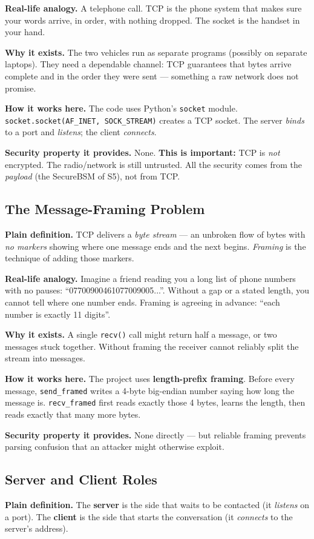 \documentclass[11pt,a4paper]{article}
\begin{document}
\textbf{Real-life analogy.} A telephone call. TCP is the phone system that makes
sure your words arrive, in order, with nothing dropped. The socket is the handset
in your hand.

\textbf{Why it exists.} The two vehicles run as separate programs (possibly on
separate laptops). They need a dependable channel: TCP guarantees that bytes
arrive complete and in the order they were sent --- something a raw network does
not promise.

\textbf{How it works here.} The code uses Python's \texttt{socket} module.
\texttt{socket.socket(AF\_INET, SOCK\_STREAM)} creates a TCP socket. The server
\emph{binds} to a port and \emph{listens}; the client \emph{connects}.

\textbf{Security property it provides.} None. \textbf{This is important:} TCP is
\emph{not} encrypted. The radio/network is still untrusted. All the security
comes from the \emph{payload} (the SecureBSM of S5), not from TCP.

\subsection{The Message-Framing Problem}
\textbf{Plain definition.} TCP delivers a \emph{byte stream} --- an unbroken flow
of bytes with \emph{no markers} showing where one message ends and the next
begins. \emph{Framing} is the technique of adding those markers.

\textbf{Real-life analogy.} Imagine a friend reading you a long list of phone
numbers with no pauses: ``07700900461077009005...''. Without a gap or a stated
length, you cannot tell where one number ends. Framing is agreeing in advance:
``each number is exactly 11 digits''.

\textbf{Why it exists.} A single \texttt{recv()} call might return half a message,
or two messages stuck together. Without framing the receiver cannot reliably
split the stream into messages.

\textbf{How it works here.} The project uses \textbf{length-prefix framing}.
Before every message, \texttt{send\_framed} writes a 4-byte big-endian number
saying how long the message is. \texttt{recv\_framed} first reads exactly those
4 bytes, learns the length, then reads exactly that many more bytes.

\textbf{Security property it provides.} None directly --- but reliable framing
prevents parsing confusion that an attacker might otherwise exploit.

\subsection{Server and Client Roles}
\textbf{Plain definition.} The \textbf{server} is the side that waits to be
contacted (it \emph{listens} on a port). The \textbf{client} is the side that
starts the conversation (it \emph{connects} to the server's address).
\end{document}
